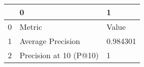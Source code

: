 \begin{tabular}{lll}
\toprule
{} &                       0 &         1 \\
\midrule
0 &                  Metric &     Value \\
1 &       Average Precision &  0.984301 \\
2 &  Precision at 10 (P@10) &         1 \\
\bottomrule
\end{tabular}
